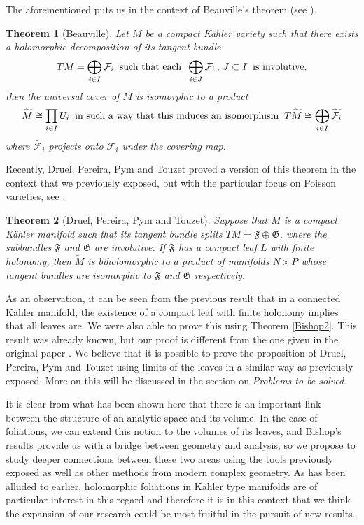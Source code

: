 \documentclass[12pt,twoside,a4paper]{report}
\newtheorem{theorem}{Theorem}[section]
\begin{document}
The aforementioned puts us in the context of Beauville's theorem (see \cite{Beuville}).
\begin{theorem}[Beauville]\label{Beauville}
        Let $M$ be a compact Kähler variety such that there exists a holomorphic decomposition of its tangent bundle
        \[
        TM=\bigoplus_{i\in I}\mathcal{F}_i\hspace{0.2cm}\text{such that each}\hspace{0.2cm}\bigoplus_{i\in J}\mathcal{F}_i\,,\,J\subset I\hspace{0.2cm}\text{is involutive},
        \]
        then the universal cover of $M$ is isomorphic to a product
        \[
        \widetilde{M}\cong\prod_{i\in I}U_i\hspace{0.2cm}\text{in such a way that this induces an isomorphism}\hspace{0.2cm}T\widetilde{M}\cong\bigoplus_{i\in I}\widetilde{\mathcal{F}_i}
      \]
      where $\widetilde{\mathcal{F}_{i}}$ projects onto $\mathcal{F}_{i}$ under the covering map.
\end{theorem}
Recently, Druel, Pereira, Pym and Touzet proved a version of this theorem in the context that we previously exposed,
but with the particular focus on Poisson varieties, see \cite{DPPT}.
\begin{theorem}[Druel, Pereira, Pym and Touzet]\label{DPPT}
        Suppose that $M$ is a compact Kähler manifold such that its tangent bundle splits $TM=\mathfrak{F}\oplus\mathfrak{G}$, where
        the subbundles $\mathfrak{F}$ and $\mathfrak{G}$ are involutive. If $\mathfrak{F}$ has a compact leaf $L$ with finite holonomy,
        then $\widetilde{M}$ is biholomorphic to a product of manifolds $N\times P$ whose tangent bundles are isomorphic
        to $\mathfrak{F}$ and $\mathfrak{G}$ respectively.
\end{theorem}
\noindent As an observation, it can be seen from the previous result that in a connected Kähler manifold, the existence
of a compact leaf with finite holonomy implies that all leaves are. We were also able to prove this using
Theorem \ref{Bishop2}. This result was already known, but our proof is different from the one given in the
original paper \cite{Pereira}.
We believe that it is possible to prove the proposition of Druel, Pereira, Pym and Touzet using limits of the leaves
in a similar way as previously exposed. More on this will be discussed in the section on \textit{Problems to be solved}.

It is clear from what has been shown here that there is an important link between the structure of an analytic space and its volume.
In the case of foliations, we can extend this notion to the volumes of its leaves, and Bishop's results
provide us with a bridge between geometry and analysis, so we propose to study deeper connections between these
two areas using the tools previously exposed as well as other methods from modern complex geometry.
As has been alluded to earlier, holomorphic foliations in Kähler type manifolds are of particular interest in this regard
and therefore it is in this context that we think the expansion of our research could be most fruitful in the
pursuit of new results.
\end{document}
